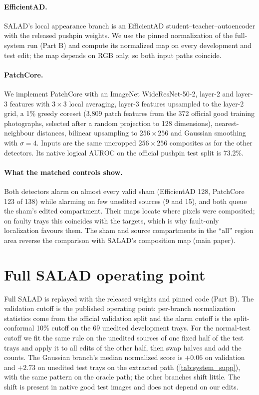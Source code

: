 \paragraph{EfficientAD.} SALAD's local appearance branch is an EfficientAD student--teacher--autoencoder \cite{batzner2024} with the released pushpin weights. We use the pinned normalization of the full-system run (Part B) and compute its normalized map on every development and test edit; the map depends on RGB only, so both input paths coincide.
\paragraph{PatchCore.} We implement PatchCore \cite{roth2022} with an ImageNet WideResNet-50-2, layer-2 and layer-3 features with $3{\times}3$ local averaging, layer-3 features upsampled to the layer-2 grid, a 1\% greedy coreset (3{,}809 patch features from the 372 official good training photographs, selected after a random projection to 128 dimensions), nearest-neighbour distances, bilinear upsampling to $256{\times}256$ and Gaussian smoothing with $\sigma=4$. Inputs are the same uncropped $256{\times}256$ composites as for the other detectors. Its native logical AUROC on the official pushpin test split is 73.2\%.
\paragraph{What the matched controls show.} Both detectors alarm on almost every valid sham (EfficientAD 128, PatchCore 123 of 138) while alarming on few unedited sources (9 and 15), and both queue the sham's edited compartment. Their maps locate where pixels were composited; on faulty trays this coincides with the targets, which is why fault-only localization favours them. The sham and source compartments in the ``all'' region area reverse the comparison with SALAD's composition map (main paper).

\section{Full SALAD operating point}
\label{sec:supp_full}
Full SALAD is replayed with the released weights and pinned code (Part B). The validation cutoff is the published operating point: per-branch normalization statistics come from the official validation split and the alarm cutoff is the split-conformal 10\% cutoff on the 69 unedited development trays. For the normal-test cutoff we fit the same rule on the unedited sources of one fixed half of the test trays and apply it to all edits of the other half, then swap halves and add the counts. The Gaussian branch's median normalized score is $+0.06$ on validation and $+2.73$ on unedited test trays on the extracted path (\cref{tab:system_supp}), with the same pattern on the oracle path; the other branches shift little. The shift is present in native good test images and does not depend on our edits.
\begin{table}[t]
\centering
\caption{\textbf{Full SALAD per branch on the extracted path} (copy of the main-paper table for reference).}
\label{tab:system_supp}
\small

\end{table}
